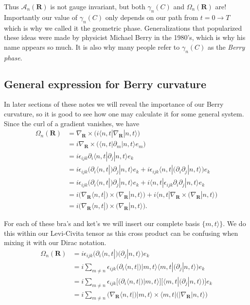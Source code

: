 \documentclass[12pt]{revtex4-2}
\begin{document}
Thus $\mathcal{A}_n(\mathbf{R})$ is not gauge invariant, but both $\gamma_n(C)$ and $\Omega_n(\mathbf{R})$ are!  Importantly our value of $\gamma_n(C)$ only depends on our path from $t=0\to T$ which is why we called it the geometric phase.  Generalizations that popularized these ideas were made by physicist Michael Berry in the 1980's, which is why his name appears so much.  It is also why many people refer to $\gamma_n(C)$ as the \emph{Berry phase}.

\subsection{General expression for Berry curvature}
In later sections of these notes we will reveal the importance of our Berry curvature, so it is good to see how one may calculate it for some general system.  Since the curl of a gradient vanishes, we have 
\begin{align}
    \Omega_n(\mathbf{R}) &= \nabla_\mathbf{R} \times \Big( i\langle n,t | \nabla_\mathbf{R} | n,t \rangle \Big) \\
    &= i \nabla_\mathbf{R} \times \Big(\langle n,t|\partial_m|n,t\rangle e_m \Big) \\
    &= i \epsilon_{ijk}\partial_i\langle n,t| \partial_j | n,t \rangle e_k \\
    &= i \epsilon_{ijk}\Big(\partial_i\langle n,t|\Big) \partial_j | n,t \rangle e_k  + i \epsilon_{ijk}\langle n,t| \Big( \partial_i \partial_j | n,t \rangle\Big) e_k \\
    &= i \epsilon_{ijk}\Big(\partial_i\langle n,t|\Big) \partial_j | n,t \rangle e_k  + i \langle n,t| \epsilon_{ijk} \partial_i \partial_j| n,t \rangle e_k \\
    &= i\Big( \nabla_\mathbf{R}\langle n,t| \Big) \times \Big( \nabla_\mathbf{R} |n,t\rangle \Big) + i \langle n,t| \nabla_\mathbf{R} \times \Big( \nabla_\mathbf{R}|n,t\rangle \Big) \\
    &= i\Big( \nabla_\mathbf{R}\langle n,t| \Big) \times \Big( \nabla_\mathbf{R} |n,t\rangle \Big).
\end{align}

For each of these bra's and ket's we will insert our complete basis $\{m,t\rangle\}$.  We do this within our Levi-Civita tensor as this cross product can be confusing when mixing it with our Dirac notation.
\begin{align}
    \Omega_n(\mathbf{R}) &= i\epsilon_{ijk}\Big(\partial_i\langle n,t|\Big) \Big(\partial_j |n,t\rangle\Big)e_k \\
    &= i\sum_{m\neq n}\epsilon_{ijk}\Big(\partial_i\langle n,t|\Big)|m,t\rangle \langle m,t| \Big(\partial_j |n,t\rangle\Big)e_k \\
    &= i\sum_{m\neq n}\epsilon_{ijk}\bigg[\Big(\partial_i\langle n,t|\Big)|m,t\rangle\bigg] \bigg[\langle m,t| \Big(\partial_j |n,t\rangle\Big)\bigg]e_k \\
    &= i\sum_{m\neq n}\Big( \nabla_\mathbf{R}\langle n,t| \Big)|m,t\rangle \times \langle m,t|\Big(|\nabla_\mathbf{R}|n,t\rangle \Big)
\end{align}
\end{document}
